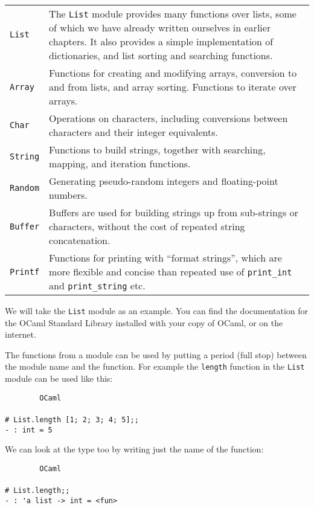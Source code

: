 \documentclass[]{book}
\renewcommand{\arraystretch}{1.2}
\newcommand{\smspace}{\vspace{4mm}}
\begin{document}
\smspace
\bgroup
\def\arraystretch{1.2}
\noindent\begin{tabular}{@{}lp{}@{}} \toprule
  \texttt{List} & The \texttt{List} module provides many functions over lists, some of which we have already written ourselves in earlier chapters. It also provides a simple implementation of dictionaries, and list sorting and searching functions.\\
  \texttt{Array} & Functions for creating and modifying arrays, conversion to and from lists, and array sorting. Functions to iterate over arrays. \\
  \texttt{Char} & Operations on characters, including conversions between characters and their integer equivalents.\\
  \texttt{String} & Functions to build strings, together with searching, mapping, and iteration functions.\\
  \texttt{Random} & Generating pseudo-random integers and floating-point numbers.\\
  \texttt{Buffer} & Buffers are used for building strings up from sub-strings or characters, without the cost of repeated string concatenation.\\
  \texttt{Printf} & Functions for printing with ``format strings'', which are more flexible and concise than repeated use of \texttt{print\_int} and \texttt{print\_string} etc.\\ \bottomrule
\end{tabular}
\egroup
\smspace

\noindent We will take the \texttt{List} module as an example. You can find the documentation for the OCaml Standard Library installed with your copy of OCaml, or on the internet.

The functions from a module can be used by putting a period (full stop) between the module name and the function. For example the \texttt{length} function in the \texttt{List} module can be used like this:

\smspace
\noindent\verb!        OCaml!\\
\noindent\\
\noindent\texttt{\# List.length [1; 2; 3; 4; 5];;}\\
\noindent\verb!- : int = 5!
\smspace

\noindent We can look at the type too by writing just the name of the function:

\smspace
\noindent\verb!        OCaml!\\
\noindent\\
\noindent\texttt{\# List.length;;}\\
\noindent\verb!- : 'a list -> int = <fun>!
\smspace
\end{document}
